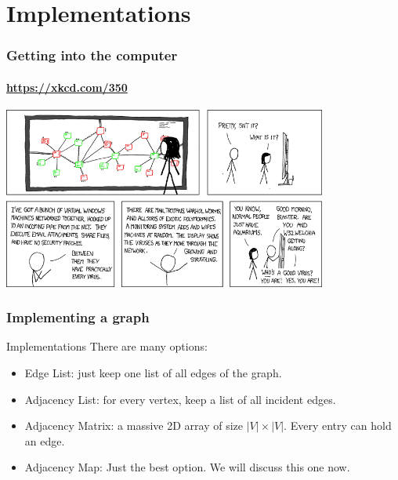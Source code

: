 \section{Implementations}%
\label{sec:implementations}

\begin{frame}
	\frametitle{Getting into the computer}
	\framesubtitle{\url{https://xkcd.com/350}}

	\begin{center}
		\includegraphics[width=0.8\textwidth]{figures/network.png}\\
	\end{center}
\end{frame}

\begin{frame}
	\frametitle{Implementing a graph}

	\begin{block}{Implementations}
		There are many options:
		\begin{itemize}
			\item Edge List: just keep one list of all edges of the graph.
				\pause
			\item Adjacency List: for every vertex, keep a list of all incident edges.
				\pause
			\item Adjacency Matrix: a massive 2D array of size $|V|\times |V|$. Every entry can hold an edge.
				\pause
			\item Adjacency Map: Just the best option. We will discuss this one now.
		\end{itemize}
	\end{block}	
\end{frame}


